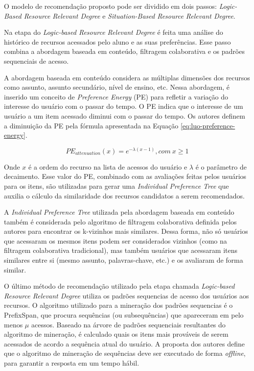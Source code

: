 O modelo de recomendação proposto pode ser dividido em dois passos: \textit{Logic-Based Resource Relevant Degree} e
\textit{Situation-Based Resource Relevant Degree}.

Na etapa do \textit{Logic-based Resource Relevant Degree} é feita uma análise do histórico de recursos acessados pelo aluno e as
suas preferências. Esse passo combina a abordagem baseada em conteúdo, filtragem colaborativa e os padrões sequenciais
de acesso.

A abordagem baseada em conteúdo considera as múltiplas dimensões dos recursos como assunto, assunto secundário, nível
de ensino, etc. Nessa abordagem, é inserido um conceito de \textit{Preference Energy} (PE) para refletir a variação do interesse
do usuário com o passar do tempo. O PE indica que o interesse de um usuário a um item acessado diminui com o passar do
tempo. Os autores definem a diminuição da PE pela fórmula apresentada na Equação \ref{eq:luo-preference-energy}.

\begin{equation}
  \label{eq:luo-preference-energy}
  PE_{attenuation}(x) = e^{- \lambda (x-1)}, com \ x \geqslant 1
\end{equation}

Onde $x$ é a ordem do recurso na lista de acessos do usuário e $\lambda$ é o parâmetro de decaimento. Esse valor do PE,
combinado com as avaliações feitas pelos usuários para os itens, são utilizadas para gerar uma \textit{Individual Preference Tree}
que auxilia o cálculo da similaridade dos recursos candidatos a serem recomendados.

A \textit{Individual Preference Tree} utilizada pela abordagem baseada em conteúdo também é considerada pelo algoritmo de
filtragem colaborativa definida pelos autores para encontrar os k-vizinhos mais similares. Dessa forma, não só usuários
que acessaram os mesmos itens podem ser considerados vizinhos (como na filtragem colaborativa tradicional), mas também
usuários que acessaram itens similares entre si (mesmo assunto, palavras-chave, etc.) e os avaliaram de forma similar.

O último método de recomendação utilizado pela etapa chamada \textit{Logic-based Resource Relevant Degree} utiliza os padrões
sequencias de acesso dos usuários aos recursos. O algoritmo utilizado para a mineração dos padrões sequencias é o
PrefixSpan, que procura sequências (ou subsequências) que apareceram em pelo menos $\mu$ acessos. Baseado na árvore de
padrões sequenciais resultantes do algoritmo de mineração, é calculado quais os itens mais prováveis de serem acessados
de acordo a sequência atual do usuário. A proposta dos autores define que o algoritmo de mineração de sequências deve
ser executado de forma \textit{offline}, para garantir a resposta em um tempo hábil.

